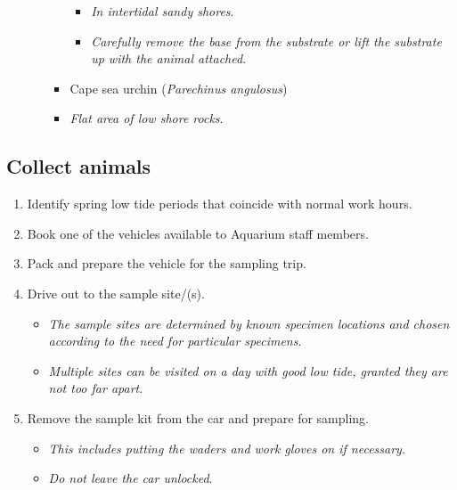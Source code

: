 \documentclass[
  letterpaper,
  DIV=11,
  numbers=noendperiod]{scrreprt}
\providecommand{\tightlist}{%
  \setlength{\itemsep}{0pt}\setlength{\parskip}{0pt}}\usepackage{longtable,booktabs,array}
\begin{document}
\begin{itemize}
\begin{itemize}
\begin{itemize}
      \begin{itemize}
      \tightlist
      \item
        \emph{In intertidal sandy shores}.
      \item
        \emph{Carefully remove the base from the substrate or lift the
        substrate up with the animal attached}.
      \end{itemize}
    \item
      Cape sea urchin (\emph{Parechinus angulosus})
    \item
      \emph{Flat area of low shore rocks}.
    \end{itemize}
  \end{itemize}
\end{itemize}

\hypertarget{collect-animals}{%
\subsection{Collect animals}\label{collect-animals}}

\begin{enumerate}
\def\labelenumi{\arabic{enumi}.}
\tightlist
\item
  Identify spring low tide periods that coincide with normal work hours.
\item
  Book one of the vehicles available to Aquarium staff members.
\item
  Pack and prepare the vehicle for the sampling trip.
\item
  Drive out to the sample site/(s).

  \begin{itemize}
  \tightlist
  \item
    \emph{The sample sites are determined by known specimen locations
    and chosen according to the need for particular specimens}.
  \item
    \emph{Multiple sites can be visited on a day with good low tide,
    granted they are not too far apart}.
  \end{itemize}
\item
  Remove the sample kit from the car and prepare for sampling.

  \begin{itemize}
  \tightlist
  \item
    \emph{This includes putting the waders and work gloves on if
    necessary}.
  \item
    \emph{Do not leave the car unlocked}.
  \end{itemize}
\end{enumerate}
\end{document}

